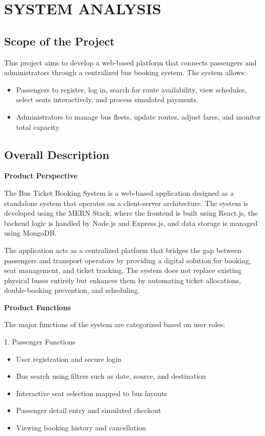 \chapter{SYSTEM ANALYSIS}
\section{Scope of the Project}
This project aims to develop a web-based platform that connects passengers and administrators through a centralized bus booking system. The system allows:
\begin{itemize}
    \item Passengers to register, log in, search for route availability, view schedules, select seats interactively, and process simulated payments.
    \item Administrators to manage bus fleets, update routes, adjust fares, and monitor total capacity.
\end{itemize}

\section{Overall Description}
\textbf{Product Perspective}

The Bus Ticket Booking System is a web-based application designed as a standalone system that operates on a client-server architecture. The system is developed using the MERN Stack, where the frontend is built using React.js, the backend logic is handled by Node.js and Express.js, and data storage is managed using MongoDB.

The application acts as a centralized platform that bridges the gap between passengers and transport operators by providing a digital solution for booking, seat management, and ticket tracking.
The system does not replace existing physical buses entirely but enhances them by automating ticket allocations, double-booking prevention, and scheduling.

\textbf{Product Functions}

The major functions of the system are categorized based on user roles:

1. Passenger Functions
\begin{itemize}
    \item User registration and secure login
    \item Bus search using filters such as date, source, and destination
    \item Interactive seat selection mapped to bus layouts
    \item Passenger detail entry and simulated checkout
    \item Viewing booking history and cancellation
\end{itemize}

